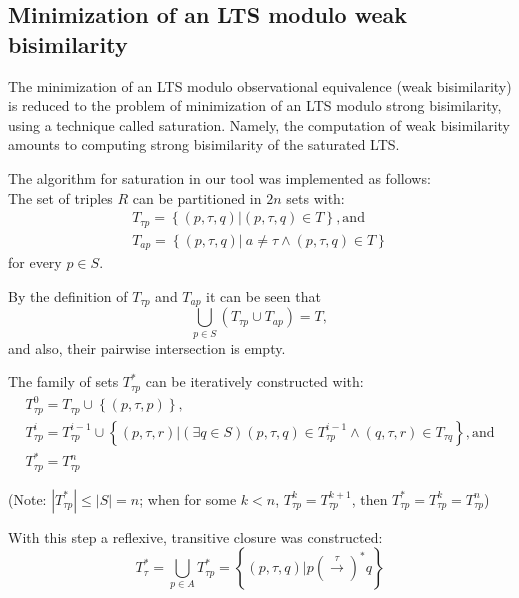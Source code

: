 \subsection{Minimization of an LTS modulo weak bisimilarity}
The minimization of an LTS modulo observational equivalence (weak bisimilarity) is reduced to the problem of minimization of an LTS modulo strong bisimilarity, using a technique called saturation. Namely, the computation of weak bisimilarity amounts to computing strong bisimilarity of the saturated LTS. 

The algorithm for saturation in our tool was implemented as follows:\\
The set of triples ${R}$ can be partitioned in ${2n}$ sets with: 
\begin{equation*}
	\begin{array}{lcl}
 		{T_{\tau p}=\left\{\left(p,\tau,q\right)| \left(p,\tau,q\right)\in T\right\}}, \text{and}\\
    {T_{ap}=\left\{\left(p,\tau,q\right)|\ a\neq\tau\wedge\left(p,\tau,q\right)\in T\right\}}
  \end{array}
\end{equation*} 
for every ${p\in S}$.

By the definition of ${T_{\tau p}}$ and ${T_{ap}}$ it can be seen that
\begin{equation*}
 {\bigcup_{p\in S}\left(T_{\tau p}\cup T_{ap}\right)=T},
\end{equation*} 
and also, their pairwise intersection is empty. 

The family of sets ${T^{*}_{\tau p}}$ can be iteratively constructed with:
\begin{equation*}
	\begin{array}{lcl}
		{T^{0}_{\tau p}=T_{\tau p}\cup\left\{\left(p,\tau,p\right)\right\}},\\
		{T^{i}_{\tau p}=T^{i-1}_{\tau p}\cup\left\{\left(p,\tau,r\right)|\left(\exists q\in S\right)\left(p,\tau,q\right)\in T^{i-1}_{\tau p}\wedge\left(q,\tau,r\right)\in T_{\tau q}\right\}}, \text{and} \\
		{T^{*}_{\tau p}=T^{n}_{\tau p}}
	\end{array}
\end{equation*}

(Note: ${\left|T^{*}_{\tau p}\right|\leq\left|S\right|=n}$; when for some ${k<n}$, ${T^{k}_{\tau p}=T^{k+1}_{\tau p}}$, then ${T^{*}_{\tau p}=T^{k}_{\tau p}=T^{n}_{\tau p}}$)

With this step a reflexive, transitive closure was constructed:
\begin{equation*}
	{T^{*}_{\tau}=\bigcup_{p\in A}T^{*}_{\tau p}=\left\{\left(p,\tau,q\right)|p\left(\stackrel{\tau}{\rightarrow}\right)^{*}q\right\}}
\end{equation*}

